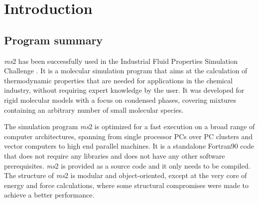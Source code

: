


\chapter{Introduction}
\label{sec:Introduction}



\section{Program summary}
\label{sec:Program Summary}


\textit{ms}2 has been successfully used in the Industrial Fluid Properties Simulation Challenge \parencite{fluidproperties}. It is a molecular simulation program that aims at the calculation of thermodynamic properties that are needed for applications in the chemical industry, without requiring expert knowledge by the user. It was developed for rigid molecular models with a focus on condensed phases, covering mixtures containing an arbitrary number of small molecular species.

The simulation program \textit{ms}2 is optimized for a fast execution on a broad range of computer architectures, spanning from single processor PCs over PC clusters and vector computers to high end parallel machines. It is a standalone Fortran90 code that does not require any libraries and does not have any other software prerequisites. \textit{ms}2 is provided as a source code and it only needs to be compiled. The structure of \textit{ms}2 is modular and object-oriented, except at the very core of energy and force calculations, where some structural compromises were made to achieve a better performance.


